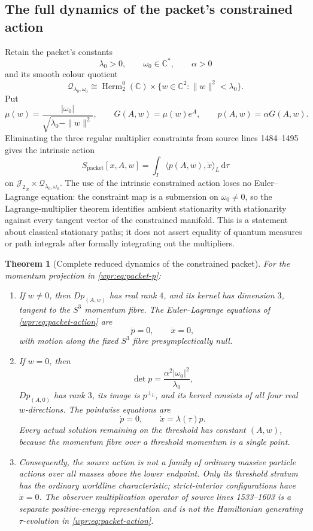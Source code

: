 \documentclass[11pt]{article}
\newtheorem{theorem}{Theorem}[section]
\newcommand{\J}{\mathcal J_2}
\newcommand{\dd}{\mathrm d}
\begin{document}
\subsection{The full dynamics of the packet's constrained action}

Retain the packet's constants
\[
 \lambda_0>0,\qquad\omega_0\in\mathbb C^*,\qquad\alpha>0
\]
and its smooth colour quotient
\[
 \mathcal Q_{\lambda_0,\omega_0}
 \cong
 \operatorname{Herm}_2^0(\mathbb C)
 \times\{w\in\mathbb C^2:\|w\|^2<\lambda_0\}.
\]
Put
\begin{equation}
 \mu(w)=\frac{|\omega_0|}
 {\sqrt{\lambda_0-\|w\|^2}},\qquad
 G(A,w)=\mu(w)e^A,\qquad
 p(A,w)=\alpha G(A,w).
 \label{wpr:eq:packet-p}
\end{equation}
Eliminating the three regular multiplier constraints from source lines
1484--1495 gives the intrinsic action
\begin{equation}
 S_{\mathrm{packet}}[x,A,w]
 =\int_I\langle p(A,w),\dot x\rangle_L\,\dd\tau
 \label{wpr:eq:packet-action}
\end{equation}
on \({\J}_x\times\mathcal Q_{\lambda_0,\omega_0}\).  The use of the
intrinsic constrained action loses no Euler--Lagrange equation:
the constraint map is a submersion on \(\omega_0\neq0\), so the
Lagrange-multiplier theorem identifies ambient stationarity with
stationarity against every tangent vector of the constrained
manifold.  This is a statement about classical stationary paths; it
does not assert equality of quantum measures or path integrals after
formally integrating out the multipliers.

\begin{theorem}[Complete reduced dynamics of the constrained packet]
\label{wpr:thm:packet-action}
For the momentum projection in \eqref{wpr:eq:packet-p}:
\begin{enumerate}[label=\textup{(\roman*)}]
\item If \(w\neq0\), then \(D p_{(A,w)}\) has real rank \(4\), and its
kernel has dimension \(3\), tangent to the \(S^3\) momentum fibre.
The Euler--Lagrange equations of \eqref{wpr:eq:packet-action} are
\[
 \dot p=0,\qquad \dot x=0,
\]
with motion along the fixed \(S^3\) fibre presymplectically null.
\item If \(w=0\), then
\[
 \det p=\frac{\alpha^2|\omega_0|^2}{\lambda_0},
\]
\(D p_{(A,0)}\) has rank \(3\), its image is
\(p^{\perp_L}\), and its kernel consists of all four real
\(w\)-directions.  The pointwise equations are
\[
 \dot p=0,\qquad \dot x=\lambda(\tau)p.
\]
Every actual solution remaining on the threshold has constant
\((A,w)\), because the momentum fibre over a threshold momentum is a
single point.
\item Consequently, the source action is not a family of ordinary
massive particle actions over all masses above the lower endpoint.
Only its threshold stratum has the ordinary worldline characteristic;
strict-interior configurations have \(\dot x=0\).  The observer
multiplication operator of source lines 1533--1603 is a separate
positive-energy representation and is not the Hamiltonian generating
\(\tau\)-evolution in \eqref{wpr:eq:packet-action}.
\end{enumerate}
\end{theorem}
\end{document}
